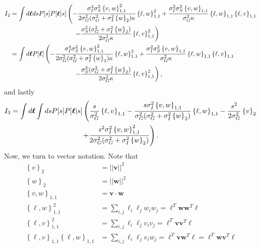 \documentclass[11pt]{article}
\begin{document}
\begin{align}
	I_2 &= \int d\boldsymbol{\ell} ds P[s] P[\boldsymbol{\ell}|s] \left(-\frac{\sigma_I^4 \sigma_S^2 \left\{v,w\right\}_{1,1}^2}{2 \sigma_G^2(\sigma_G^2 + \sigma_I^2 \left\{w\right\}_2) \kappa} \left\{\ell, w\right\}_{1,1}^2 + \frac{\sigma_I^2 \sigma_S^2\left\{v,w\right\}_{1,1}}{\sigma_G^2\kappa} \left\{\ell, w\right\}_{1,1} \left\{\ell, v\right\}_{1,1}\right. \notag \\
	&\left. \qquad \qquad \qquad \qquad \qquad  -\frac{\sigma_S^2 (\sigma_G^2 + \sigma_I^2 \left\{w\right\}_2)}{2 \sigma_G^2 \kappa} \left\{\ell, v\right\}_{1,1}^2 \right) \\
	&= \int d\boldsymbol{\ell} P[\boldsymbol{\ell}] \left(-\frac{\sigma_I^4 \sigma_S^2 \left\{v,w\right\}_{1,1}^2}{2 \sigma_G^2(\sigma_G^2 + \sigma_I^2 \left\{w\right\}_2) \kappa} \left\{\ell, w\right\}_{1,1}^2 + \frac{\sigma_I^2 \sigma_S^2\left\{v,w\right\}_{1,1}}{\sigma_G^2\kappa} \left\{\ell, w\right\}_{1,1} \left\{\ell, v\right\}_{1,1}\right. \notag \\
	&\left. \qquad \qquad \qquad \qquad \qquad  -\frac{\sigma_S^2 (\sigma_G^2 + \sigma_I^2 \left\{w\right\}_2)}{2 \sigma_G^2 \kappa} \left\{\ell, v\right\}_{1,1}^2 \right),
\end{align}
and lastly 
\begin{align}
	I_3 &= \int d\boldsymbol{\ell} \int ds P[s] P[\boldsymbol{\ell}|s] \left(\frac{s}{\sigma_G^2} \left\{\ell, v\right\}_{1,1} - \frac{s \sigma_I^2 \left\{v,w\right\}_{1,1}}{\sigma_G^2 (\sigma_G^2 + \sigma_I^2 \left\{w\right\}_2)}\left\{\ell, w\right\}_{1,1} - \frac{s^2}{2\sigma_G^2} \left\{v\right\}_2 \right. \notag \\
	&\qquad  \qquad \qquad \qquad \qquad \left. + \frac{s^2 \sigma_I^2 \left\{v,w\right\}_{1,1}^2}{2\sigma_G^2 (\sigma_G^2 + \sigma_I^2 \left\{w\right\}_2)}\right).
\end{align}
Now, we turn to vector notation. Note that 
\begin{align}
\left\{v\right\}_2 &= ||\mathbf{v}||^2 \\
\left\{w\right\}_2 &= ||\mathbf{w}||^2 \\
\left\{v,w\right\}_{1,1} &= \mathbf{v}\cdot \mathbf{w}\\
\left\{\ell, w\right\}_{1,1}^2 &= \sum_{i,j} \ell_i \ell_j w_i w_j = \boldsymbol{\ell}^T \mathbf{ww}^T \boldsymbol{\ell} \\
\left\{\ell, v\right\}_{1,1}^2 &= \sum_{i,j} \ell_i \ell_j  v_i v_j = \boldsymbol{\ell}^T \mathbf{vv}^T \boldsymbol{\ell} \\
\left\{\ell, v\right\}_{1,1} \left\{\ell,w\right\}_{1,1}&= \sum_{i,j} \ell_i \ell_j v_i w_j= \boldsymbol{\ell}^T \mathbf{vw}^T \boldsymbol{\ell} = \boldsymbol{\ell}^T \mathbf{w}\mathbf{v}^T \boldsymbol{\ell}
\end{align}
\end{document}
